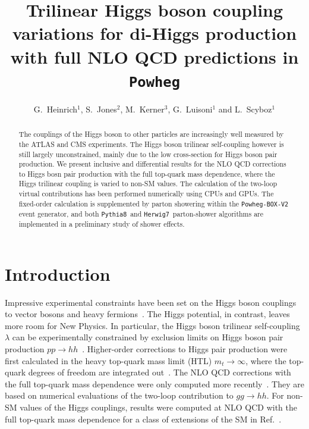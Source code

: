 \documentclass[a4paper]{jpconf}
\newcommand{\pythia}{\texttt{Pythia8}}
\newcommand{\herwig}{\texttt{Herwig7}}
\begin{document}
\title{Trilinear Higgs boson coupling variations for di-Higgs production with full NLO QCD predictions in \texttt{Powheg}}

\author{G.~Heinrich$^1$, S.~Jones$^2$, M.~Kerner$^3$, G.~Luisoni$^1$ and L.~Scyboz$^1$}

\address{$^1$ Max-Planck-Institut f\"ur Physik, F\"ohringer Ring 6, 80805 M\"unchen, Germany}
\address{$^2$ Theoretical Physics Department, CERN, Geneva, Switzerland}
\address{$^3$ Physik-Institut, Universit\"at Z\"urich, Winterthurerstrasse 190, 8057 Z\"urich, Switzerland}


\begin{abstract}
The couplings of the Higgs boson to other particles are increasingly well measured by the ATLAS and CMS experiments. The Higgs boson trilinear self-coupling however is still largely unconstrained,  mainly due to the low cross-section for Higgs boson pair production. We present inclusive and differential results for the NLO QCD corrections to Higgs bosn pair production with the full top-quark mass dependence, where the Higgs trilinear coupling is varied to non-SM values. The calculation of the two-loop virtual contributions has been performed numerically using CPUs and GPUs. The fixed-order calculation is supplemented by parton showering within the \texttt{Powheg-BOX-V2} event generator, and both \pythia~and \herwig~parton-shower algorithms are implemented in a preliminary study of shower effects.
\end{abstract}


\section{Introduction}

Impressive experimental constraints have been set on the Higgs boson couplings to vector bosons and heavy fermions~\cite{Khachatryan:2016vau,Aaboud:2017vzb,Sirunyan:2018koj,Sirunyan:2018sgc}. The Higgs potential, in contrast, leaves more room for New Physics. In particular, the Higgs boson trilinear self-coupling $\lambda$ can be experimentally constrained by exclusion limits on Higgs boson pair production $pp \to hh$~\cite{Sirunyan:2018two,ATLAS-CONF-2018-043}.
Higher-order corrections to Higgs pair production were first calculated in the heavy top-quark mass limit (HTL) $m_t \to \infty$, where the top-quark degrees of freedom are integrated out~\cite{Dawson:1998py,deFlorian:2013jea,Grigo:2014jma,deFlorian:2016uhr}. The NLO QCD corrections with the full top-quark mass dependence were only computed more recently~\cite{Borowka:2016ehy,Borowka:2016ypz,Baglio:2018lrj}. They are based on numerical evaluations of the two-loop contribution to $gg \to hh$. For non-SM values of the Higgs couplings, results were computed at NLO QCD with the full top-quark mass dependence for a class of extensions of the SM in Ref.~\cite{Buchalla:2018yce}.
\end{document}
